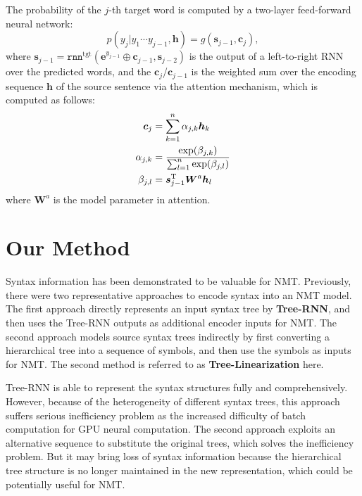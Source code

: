 \documentclass[11pt,a4paper]{article}
\begin{document}
\begin{CJK}{UTF8}{gbsn}
The probability of the $j$-th target word is computed by a two-layer feed-forward neural network:
\begin{equation} \label{decode-ref}
p(y_j | y_1\cdots y_{j-1}, \bm{h}) = g(\bm{s}_{j-1},\bm{c}_j),
\end{equation}
where $\bm{s}_{j-1} = \texttt{rnn}^{\text{tgt}}(\bm{e}^{y_{j-1}}\oplus \bm{c}_{j-1}, \bm{s}_{j-2})$ is the output of a left-to-right RNN  over the predicted words, and the $\bm{c}_j$/$\bm{c}_{j-1}$ is the weighted sum over the encoding sequence $\bm{h}$ of the source sentence via the attention mechanism,
which is computed as follows:
\begin{equation} \label{attention-score}
\begin{split}
\bm{c}_j &= \sum_{k=1}^{n} \alpha_{j,k}\bm{h}_k \\
\alpha_{j,k} & = \frac{\exp(\beta_{j,k})}{\sum_{l=1}^{n} \exp(\beta_{j,l}) } \\
\beta_{j,l} &= \bm{s}_{j-1}^{\textup T} \bm{W}^a \bm{h}_l
\end{split}
\end{equation}
where $\bm{W}^a$ is the model parameter in attention.


















\section{Our Method}
Syntax information has been demonstrated to be valuable for NMT.
Previously, there were two representative approaches to encode syntax into an NMT model.
The first approach directly represents an input syntax tree by \textbf{Tree-RNN},
and then uses the Tree-RNN outputs as additional encoder inputs for NMT.
The second approach models source syntax trees indirectly
by first converting a hierarchical tree into a sequence of symbols,
and then use the symbols as inputs for NMT.
The second method is referred to as \textbf{Tree-Linearization} here.

Tree-RNN is able to represent the syntax structures fully and comprehensively.
However, because of the heterogeneity of different syntax trees,
this approach suffers serious inefficiency problem as the increased difficulty
of batch computation for GPU neural computation.
The second approach exploits an alternative sequence to substitute the original trees,
which solves the inefficiency problem.
But it may bring loss of syntax information
because the hierarchical tree structure is no longer maintained in the new representation,
which could be potentially useful for NMT.


\end{CJK}
\end{document}
